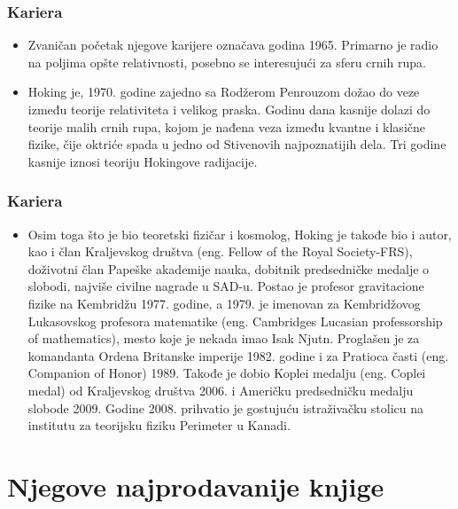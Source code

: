 \documentclass{beamer}
\begin{document}
\begin{frame}[fragile]\frametitle{Kariera}
\begin{itemize}	 \fontsize{9}{6}\selectfont
\item  Zvaničan početak njegove karijere označava godina 1965. Primarno je radio na poljima opšte relativnosti, posebno se interesujući za sferu crnih rupa.
\item Hoking je, 1970. godine zajedno sa Rodžerom Penrouzom dožao do veze između teorije relativiteta i velikog praska. Godinu dana kasnije dolazi do teorije malih crnih rupa, kojom je nađena veza između kvantne i klasične fizike, čije oktriće spada u jedno od Stivenovih najpoznatijih dela. Tri godine kasnije iznosi teoriju Hokingove radijacije. 
\end{itemize}
\end{frame}
\begin{frame}[fragile]\frametitle{Kariera}
	\begin{itemize}	 \fontsize{9}{6}\selectfont	
	\item  Osim toga što je bio teoretski fizičar i kosmolog, Hoking je takođe bio i autor, kao i član Kraljevskog društva (eng. Fellow of the Royal Society-FRS), doživotni član Papeške akademije nauka, dobitnik predsedničke medalje o slobodi, najviše civilne nagrade u SAD-u.	 Postao je profesor gravitacione fizike na Kembridžu 1977. godine, a 1979. je imenovan za Kembridžovog Lukasovskog profesora matematike (eng. Cambridges Lucasian professorship of mathematics), mesto koje je nekada imao Isak Njutn. Proglašen je za komandanta Ordena Britanske imperije 1982. godine i za Pratioca časti (eng. Companion of Honor) 1989. Takođe je dobio Koplei medalju (eng. Coplei medal) od Kraljevskog društva 2006. i Američku predsedničku medalju slobode 2009. Godine 2008. prihvatio je gostujuću istraživačku stolicu na institutu za teorijsku fiziku Perimeter u Kanadi.
	\end{itemize}
	\end{frame}
\section{Njegove najprodavanije knjige}
\end{document}
